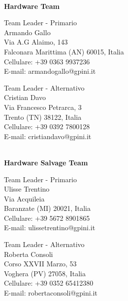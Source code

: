 \documentclass[12pt, a4paper, titlepage]{report}
\begin{document}
	\centerline{\textbf{\\Hardware Team}}
	\begin{paracol}{2}
		\setlength{\columnsep}{5em}
		\begin{leftcolumn}
			\begin{adjustwidth}{0.5cm}{}
				Team Leader - Primario \\
				Armando Gallo \\
				Via A.G Alaimo, 143\\ 
				Falconara Marittima (AN) 60015, Italia \\ 
				Cellulare: +39 0363 9937236 \\
				E-mail:  armandogallo@gpini.it 
			\end{adjustwidth}
		\end{leftcolumn}
		\begin{rightcolumn}
			\begin{adjustwidth}{0.5cm}{}
				Team Leader - Alternativo \\
				Cristian Davo\\
				Via Francesco Petrarca, 3\\
				Trento (TN) 38122, Italia \\
				Cellulare:  +39 0392 7800128 \\
				E-mail: cristiandavo@gpini.it 
			\end{adjustwidth}
		\end{rightcolumn}
	\end{paracol}
	
	\vspace{0.5cm}
	\centerline{\textbf{\\Hardware Salvage Team}}
	\begin{paracol}{2}
		\setlength{\columnsep}{5em}
		\begin{leftcolumn}
			\begin{adjustwidth}{0.5cm}{}
				Team Leader - Primario \\
				Ulisse Trentino \\
				Via Acquileia\\ 
				Baranzate (MI) 20021, Italia \\
				Cellulare:  +39 5672 8901865 \\
				E-mail:  ulissetrentino@gpini.it 
			\end{adjustwidth}
		\end{leftcolumn}
		\begin{rightcolumn}
			\begin{adjustwidth}{0.5cm}{}
				Team Leader - Alternativo \\
				Roberta Consoli\\
				Corso XXVII Marzo, 53\\ 
				Voghera (PV) 27058, Italia \\
				Cellulare:  +39 0352 65412380 \\
				E-mail: robertaconsoli@gpini.it 
			\end{adjustwidth}
		\end{rightcolumn}
	\end{paracol}
	
\end{document}

